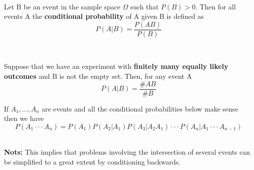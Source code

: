 \documentclass{tufte-handout}
\begin{document}
        \begin{Definition} \phantom{text} \\
            Let B be an event in the sample space $ \Omega $ such that $ P(B) > 0 $. Then for all 
            events A the \textbf{conditional probability} of A given B is defined as 
            \[P(A|B )=\frac{P(AB )}{P(B )}\]
        \end{Definition}\
        
        \begin{Theorem}
            Suppose that we have an experiment with \textbf{finitely many equally likely outcomes} and B is not the empty set.
            Then, for any event A 
            \[P(A|B ) = \frac{\#AB }{\#B}\]
        \end{Theorem}

        

        \begin{Theorem}
            If $ A_{1}, ... , A_{n } $ are events and all the conditional probabilities below make sense then we 
            have
            \[P(A_{1}\cdot \cdot \cdot A_{n })=P(A_{1})P(A_{2}|A_{1})P(A_{3}|A_{2}A_{1})\cdot \cdot \cdot P(A_{n }|A_{1}\cdot \cdot \cdot A_{n-1}) \]\\
        \end{Theorem}
        
        \textbf{Nots:} This implies that problems involving the intersection of several events can be 
        simplified to a great extent by conditioning backwards.
\end{document}
